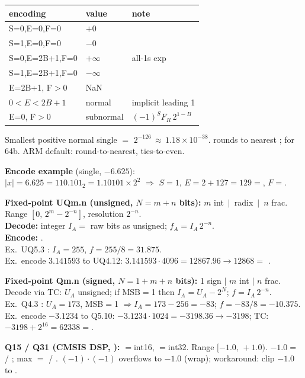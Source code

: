 \begin{center}\scriptsize
\begin{tabular}{@{}lll@{}}
\toprule
encoding & value & note \\
\midrule
S=0,E=0,F=0           & $+0$    & \\
S=1,E=0,F=0           & $-0$    & \\
S=0,E=2B+1,F=0        & $+\infty$ & all-1s exp \\
S=1,E=2B+1,F=0        & $-\infty$ & \\
E=2B+1, F$>$0          & NaN     & \\
$0<E<2B+1$            & normal  & implicit leading 1 \\
E=0, F$>$0             & subnormal & $(-1)^S F_R\,2^{1-B}$ \\
\bottomrule
\end{tabular}
\end{center}
Smallest positive normal single $=$ $2^{-126}\,{\approx}\,1.18{\times}10^{-38}$.  rounds to nearest ;  for 64b. ARM default: round-to-nearest, ties-to-even.

\textbf{Encode example} (single, $-6.625$):\\
$|x|=6.625 = 110.101_2 = 1.10101 \times 2^2$ $\Rightarrow$ $S=1$, $E=2+127=129=$, $F=$.

\textbf{Fixed-point UQm.n (unsigned, $N=m+n$ bits):} $m$ int $\,|\,$ radix $\,|\,$ $n$ frac. Range $[0,\,2^m-2^{-n}]$, resolution $2^{-n}$.\\
\textbf{Decode:} integer $I_A=$ raw bits as unsigned; $f_A = I_A\,2^{-n}$.\\
\textbf{Encode:} .\\
Ex.\ UQ5.3 : $I_A=255$, $f=255/8=31.875$.\\
Ex.\ encode $3.141593$ to UQ4.12: $3.141593{\cdot}4096 = 12867.96 \to 12868 =$ .

\textbf{Fixed-point Qm.n (signed, $N=1+m+n$ bits):} 1 sign $|$ $m$ int $|$ $n$ frac. Decode via TC: $U_A$ unsigned; if MSB$=$1 then $I_A = U_A - 2^N$; $f = I_A\,2^{-n}$.\\
Ex.\ Q4.3 : $U_A=173$, MSB$=$1 $\Rightarrow I_A=173-256=-83$; $f=-83/8=-10.375$.\\
Ex.\ encode $-3.1234$ to Q5.10: $-3.1234\cdot 1024 = -3198.36 \to -3198$; TC: $-3198+2^{16}=62338=$.

\textbf{Q15 / Q31 (CMSIS DSP, ):} $=$int16, $=$int32. Range $[-1.0,\,+1.0)$. $-1.0 =$  / ; max $=$  / . $(-1)\cdot(-1)$ overflows to $-1.0$ (wrap); workaround: clip $-1.0$ to .

